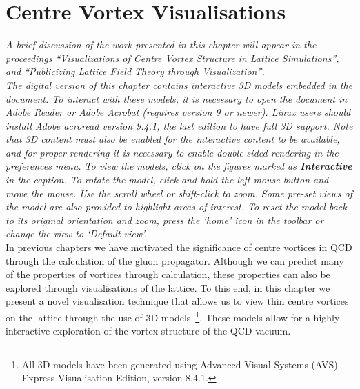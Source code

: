 
\chapter{Centre Vortex Visualisations}\label{chapter:Visualisations}
\ifpdf
    \graphicspath{{Chapter7/Figs/Raster/}{Chapter7/Figs/PDF/}{Chapter7/Figs/}}
\else
    \graphicspath{{Chapter7/Figs/Vector/}{Chapter7/Figs/}}
\fi
\textit{A brief discussion of the work presented in this chapter will appear in the proceedings ``Visualizations of Centre Vortex Structure in Lattice Simulations'', }\citet{Biddle:2018a} \textit{and ``Publicizing Lattice Field Theory through Visualization'', }\citet{Biddle:2018b}\\

\textit{The digital version of this chapter contains interactive 3D models embedded in the document. To interact with these models, it is necessary to open the document in Adobe Reader or Adobe Acrobat (requires version 9 or newer). Linux users should install Adobe acroread version 9.4.1, the last edition to have full 3D support. Note that 3D content must also be enabled for the interactive content to be available, and for proper rendering it is necessary to enable double-sided rendering in the preferences menu. To view the models, click on the figures marked as \textbf{Interactive} in the caption. To rotate the model, click and hold the left mouse button and move the mouse. Use the scroll wheel or shift-click to zoom. Some pre-set views of the model are also provided to highlight areas of interest. To reset the model back to its original orientation and zoom, press the ‘home’ icon in the toolbar or change the view to ‘Default view’.}\\

In previous chapters we have motivated the significance of centre vortices in QCD through the calculation of the gluon propagator. Although we can predict many of the properties of vortices through calculation, these properties can also be explored through visualisations of the lattice. To this end, in this chapter we present a novel visualisation technique that allows us to view thin centre vortices on the lattice through the use of 3D models~\footnote{All 3D models have been generated using Advanced Visual Systems (AVS) Express Visualisation Edition, version 8.4.1.}. These models allow for a highly interactive exploration of the vortex structure of the QCD vacuum.

